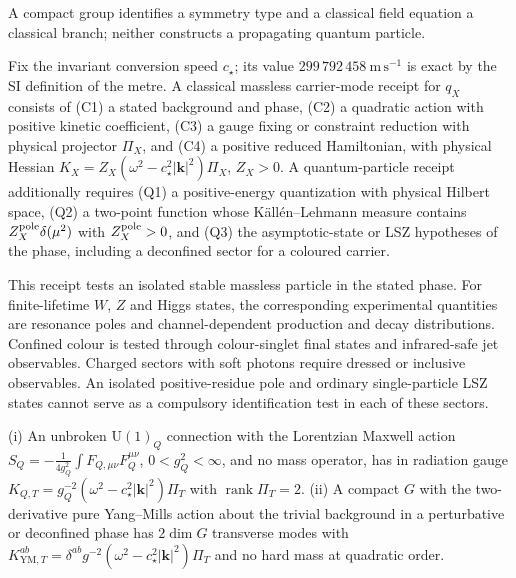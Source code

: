 \documentclass[11pt]{article}
\begin{document}
A compact group identifies a symmetry type and a classical field equation a
classical branch; neither constructs a propagating quantum particle.

\begin{definition}
Fix the invariant conversion speed \(c_\star\); its value
\(299\,792\,458\ \mathrm{m\,s^{-1}}\) is exact by the SI definition of the metre.
A classical massless carrier-mode receipt for \(q_X\) consists of (C1) a stated
background and phase, (C2) a quadratic action with positive kinetic
coefficient, (C3) a gauge fixing or constraint reduction with physical
projector \(\Pi_X\), and (C4) a positive reduced Hamiltonian, with physical
Hessian \(K_X=Z_X(\omega^2-c_\star^2|\mathbf k|^2)\Pi_X\), \(Z_X>0\). A
quantum-particle receipt additionally requires (Q1) a positive-energy
quantization with physical Hilbert space, (Q2) a two-point function whose
K\"all\'en--Lehmann measure contains \(Z^{\rm pole}_X\delta(\mu^2)\) with
\(Z^{\rm pole}_X>0\), and (Q3) the asymptotic-state or LSZ hypotheses of the
phase, including a deconfined sector for a coloured carrier.
\end{definition}

This receipt tests an isolated stable massless particle in the stated
phase. For finite-lifetime $W$, $Z$ and Higgs states, the corresponding
experimental quantities are resonance poles and channel-dependent production
and decay distributions. Confined colour is tested through colour-singlet
final states and infrared-safe jet observables. Charged sectors with soft
photons require dressed or inclusive observables. An isolated positive-residue
pole and ordinary single-particle LSZ states cannot serve as a compulsory
identification test in each of these sectors.

\begin{theorem}
(i) An unbroken \(\mathrm U(1)_Q\) connection with the Lorentzian Maxwell action
\(S_Q=-\frac1{4g_Q^2}\int F_{Q,\mu\nu}F_Q^{\mu\nu}\), \(0<g_Q^2<\infty\), and no mass
operator, has in radiation gauge
\(K_{Q,T}=g_Q^{-2}(\omega^2-c_\star^2|\mathbf k|^2)\Pi_T\) with
\(\operatorname{rank}\Pi_T=2\). (ii) A compact \(G\) with the two-derivative pure
Yang--Mills action about the trivial background in a perturbative or
deconfined phase has \(2\dim G\) transverse modes with
\(K^{ab}_{\mathrm{YM},T}=\delta^{ab}g^{-2}(\omega^2-c_\star^2|\mathbf k|^2)\Pi_T\)
and no hard mass at quadratic order.
\end{theorem}
\end{document}
